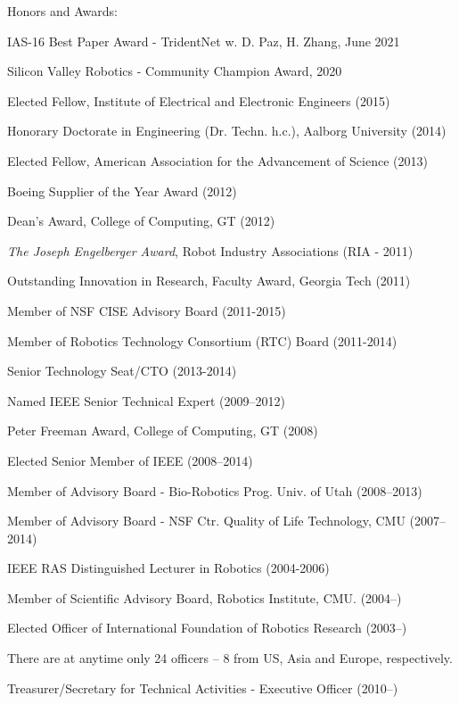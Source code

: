 \documentclass{article}
\newenvironment{sublist}{%
  \begin{list}{}{%
      \setlength{\itemsep}{0em}\setlength{\parsep}{0em}%
      \setlength{\topsep}{0em}\setlength{\parskip}{0em}%
    }%
}%
{ \end{list} }
\begin{document}
\begin{cv}
\begin{cvlist}{Honors and Awards:}
\item IAS-16 Best Paper Award - TridentNet w. D. Paz, H. Zhang, June 2021
\item Silicon Valley Robotics - Community Champion Award, 2020
\item Elected Fellow, Institute of Electrical and Electronic Engineers (2015)
\item Honorary Doctorate in Engineering (Dr. Techn. h.c.), Aalborg University (2014)
\item Elected Fellow, American Association for the Advancement of Science (2013)
\item Boeing Supplier of the Year Award (2012)
\item Dean's Award, College of Computing, GT (2012)
\item {\em The Joseph Engelberger Award}, Robot Industry Associations (RIA - 2011)
\item Outstanding Innovation in Research, Faculty Award, Georgia Tech (2011)
\item Member of NSF CISE Advisory Board (2011-2015)
\item Member of Robotics Technology Consortium (RTC) Board (2011-2014)
  \begin{sublist}
  \item Senior Technology Seat/CTO (2013-2014)
  \end{sublist}
\item Named IEEE Senior Technical Expert (2009--2012)
\item Peter Freeman Award, College of Computing, GT (2008)
\item Elected Senior Member of IEEE (2008--2014)
\item Member of Advisory Board - Bio-Robotics Prog. Univ. of Utah (2008--2013)
\item Member of Advisory Board - NSF Ctr. Quality of Life Technology,
  CMU (2007--2014)
\item IEEE RAS Distinguished Lecturer in Robotics (2004-2006)
\item Member of Scientific Advisory Board, Robotics Institute, CMU.  (2004--)
\item Elected Officer of International Foundation of Robotics Research
  (2003--)
  \begin{sublist}
  \item There are at anytime only 24 officers -- 8 from US, Asia and Europe,
    respectively.
  \item Treasurer/Secretary for Technical Activities - Executive Officer (2010--)

\end{sublist}
\end{cvlist}
\end{cv}
\end{document}
